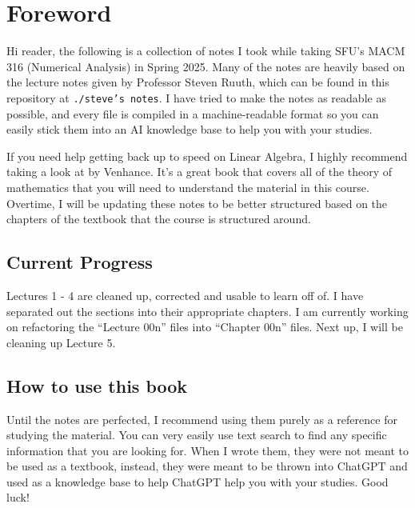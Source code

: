 \section*{Foreword}

Hi reader, the following is a collection of notes I took while taking SFU's MACM
316 (Numerical Analysis) in Spring 2025. Many of the notes are heavily based on
the lecture notes given by Professor Steven Ruuth, which can be found in this
repository at \texttt{./steve's notes}. I have tried to make the notes as
readable as possible, and every file is compiled in a machine-readable format so
you can easily stick them into an AI knowledge base to help you with your
studies.

If you need help getting back up to speed on Linear Algebra, I highly recommend
taking a look at  by Venhance. It's a great book that covers all of the
theory of mathematics that you will need to understand the material in this
course.
Overtime, I will be updating these notes to be better structured based on the
chapters of the textbook that the course is structured around.

\subsection*{Current Progress}

Lectures 1 - 4 are cleaned up, corrected and usable to learn off of.
I have separated out the sections
into their appropriate chapters. I am currently working on refactoring the
\enquote{Lecture 00n} files into \enquote{Chapter 00n} files. Next up, I will be
cleaning up Lecture 5.

\subsection*{How to use this book}

Until the notes are perfected, I recommend using them purely as a reference for
studying the material. You can very easily use text search to find any specific
information that you are looking for. When I wrote them, they were not meant to
be used as a textbook, instead, they were meant to be thrown into ChatGPT and
used as a knowledge base to help ChatGPT help you with your studies. Good luck!
